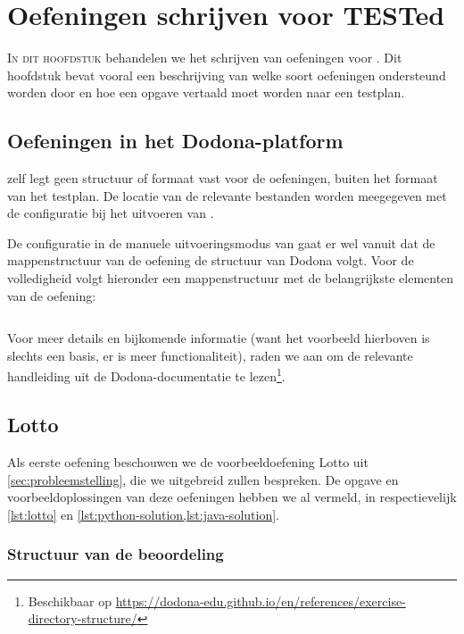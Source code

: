 \chapter{Oefeningen schrijven voor TESTed}\label{ch:nieuwe-oefening}

\lettrine{I}{n dit hoofdstuk} behandelen we het schrijven van oefeningen voor \tested{}.
Dit hoofdstuk bevat vooral een beschrijving van welke soort oefeningen ondersteund worden door \tested{} en hoe een opgave vertaald moet worden naar een testplan.

\section{Oefeningen in het Dodona-platform}\label{sec:oefeningen-in-het-dodona-platform}

\tested{} zelf legt geen structuur of formaat vast voor de oefeningen, buiten het formaat van het testplan.
De locatie van de relevante bestanden worden meegegeven met de configuratie bij het uitvoeren van \tested{}.

De configuratie in de manuele uitvoeringsmodus van \tested{} gaat er wel vanuit dat de mappenstructuur van de oefening de structuur van Dodona volgt.
Voor de volledigheid volgt hieronder een mappenstructuur met de belangrijkste elementen van de oefening:

\inputminted{text}{code/dirs-exercise.txt}

Voor meer details en bijkomende informatie (want het voorbeeld hierboven is slechts een basis, er is meer functionaliteit), raden we aan om de relevante handleiding uit de Dodona-documentatie te lezen\footnote{Beschikbaar op \url{https://dodona-edu.github.io/en/references/exercise-directory-structure/}}.

\section{Lotto}\label{sec:oefening-lotto}

Als eerste oefening beschouwen we de voorbeeldoefening Lotto uit \cref{sec:probleemstelling}, die we uitgebreid zullen bespreken.
De opgave en voorbeeldoplossingen van deze oefeningen hebben we al vermeld, in respectievelijk \cref{lst:lotto} en \cref{lst:python-solution,lst:java-solution}.

\subsection{Structuur van de beoordeling}\label{subsec:oefening-lotto-structuur}

